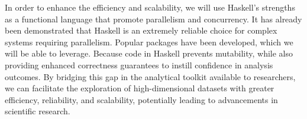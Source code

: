 \documentclass[11pt,letterpaper]{article}
\begin{document}



In order to enhance the efficiency and scalability, we will use Haskell's strengths as a functional language that promote parallelism and concurrency. 
It has already been demonstrated that Haskell is an extremely reliable choice for complex systems requiring parallelism. %
Popular packages have been developed, which we will be able to leverage. %
Because code in Haskell prevents mutability, while also providing enhanced correctness guarantees to instill confidence in analysis outcomes. By bridging this gap in the analytical toolkit available to researchers, we can facilitate the exploration of high-dimensional datasets with greater efficiency, reliability, and scalability, potentially leading to advancements in scientific research. 
\end{document}
